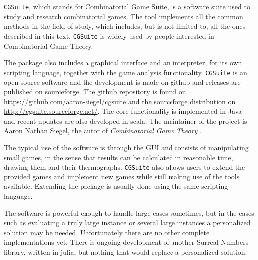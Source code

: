 \texttt{CGSuite}, which stands for Combinatorial Game Suite, is a software suite used to study and research combinatorial games. The tool implements all the common methods in the field of study, which includes, but is not limited to, all the ones described in this text. \texttt{CGSuite} is widely used by people interested in Combinatorial Game Theory.

The package also includes a graphical interface and an interpreter, for its own scripting language, together with the game analysis functionality. \texttt{CGSuite} is an open source software and the development is made on github and releases are published on sourceforge. The github repository is found on \href{https://github.com/aaron-siegel/cgsuite}{https://github.com/aaron-siegel/cgsuite} and the sourceforge distribution on \href{http://cgsuite.sourceforge.net/}{http://cgsuite.sourceforge.net/}. The core functionality is implemented in Java and recent updates are also developed in scala. The maintainer of the project is Aaron Nathan Siegel, the autor of \textit{Combinatorial Game Theory} \cite{CGT}.

The typical use of the software is through the GUI and consists of manipulating small games, in the sense that results can be calculated in reasonable time, drawing them and their thermographs. \texttt{CGSuite} also allows users to extend the provided games and implement new games while still making use of the tools available. Extending the package is usually done using the same scripting language. 

The software is powerful enough to handle large cases sometimes, but in the cases such as evaluating a truly large instance or several large instances a personalized solution may be needed. Unfortunately there are no other complete implementations yet. There is ongoing development of another Surreal Numbers library, written in julia, but nothing that would replace a personalized solution.







